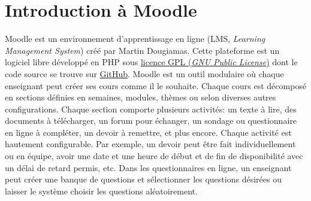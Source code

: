 \chapter{Introduction \`a Moodle}
Moodle est un environnement d'apprentissage en ligne (LMS, \textit{Learning Management System}) cr\'e\'e par Martin Dougiamas.
Cette plateforme est un logiciel libre d\'evelopp\'e en PHP sous \href{http://docs.moodle.org/dev/License}{licence GPL (\textit{GNU Public License})} dont le code source se trouve sur \href{https://github.com/moodle/moodle}{GitHub}.
Moodle est un outil modulaire o\`u chaque enseignant peut cr\'eer ses cours comme il le souhaite.
Chaque cours est d\'ecompos\'e en sections d\'efinies en semaines, modules, th\`emes ou selon diverses autres configurations.
Chaque section comporte plusieurs activit\'es: un texte \`a lire, des documents \`a t\'el\'echarger, un forum pour \'echanger, un sondage ou questionnaire en ligne \`a compl\'eter, un devoir \`a remettre, et plus encore.
Chaque activit\'e est hautement configurable.
Par exemple, un devoir peut \^etre fait individuellement ou en \'equipe, avoir une date et une heure de d\'ebut et de fin de disponibilit\'e avec un d\'elai de retard permis, etc.
Dans les questionnaires en ligne, un enseignant peut cr\'eer une banque de questions et s\'electionner les questions d\'esir\'ees ou laisser le syst\`eme choisir les questions al\'eatoirement.

